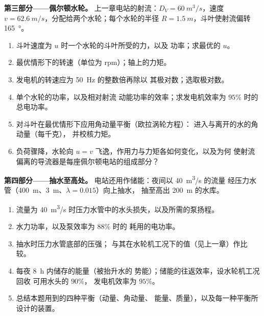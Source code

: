\begin{problem}
\medskip
\noindent\textbf{第三部分——佩尔顿水轮。}
上一章电站的射流：$D_V = \qty{60}{m^3/s}$，速度 $v =
\qty{62.6}{m/s}$，分配给两个水轮；每个水轮的半径 $R =
\qty{1.5}{m}$，斗叶使射流偏转 \qty{165}{\degree}。
\begin{enumerate}[resume]
  \item 斗叶速度为 $u$ 时一个水轮的斗叶所受的力，以及
        功率；求最优的 $u$。
  \item 最优情形下的转速（单位为 rpm）；轴上的力矩。
  \item 发电机的转速应为 \qty{50}{Hz} 的整数倍再除以
        其极对数；选取极对数。
  \item 单个水轮的功率，以及相对射流
        动能功率的效率；求发电机效率为 $95\%$ 时的
        总电功率。
  \item 对斗叶在最优情形下应用角动量平衡（欧拉涡轮方程）：
        进入与离开的水的角动量（每千克），
        并校核力矩。
  \item 负荷骤降，水轮向 $u =
        v$ 飞逸，作用力与力矩各如何变化，以及为何
        使射流偏离的导流器是每座佩尔顿电站的组成部分？
\end{enumerate}

\medskip
\noindent\textbf{第四部分——抽水至高处。}
电站还用作储能：夜间以 \qty{40}{m^3/s} 的流量
经压力水管（\qty{400}{m}、\qty{3}{m}、$\lambda = 0.015$）向上抽水，
抽至高出 \qty{200}{m} 的水库。
\begin{enumerate}[resume]
  \item 流量为 \qty{40}{m^3/s} 时压力水管中的水头损失，以及所需的泵扬程。
  \item 水力功率，以及泵效率为 $88\%$ 时的
        耗用的电功率。
  \item 抽水时压力水管底部的压强；
        与其在水轮机工况下的值（见上一章）作比较。
  \item 每夜 \qty{8}{h} 内储存的能量（被抬升水的
        势能）；储能的往返效率，设水轮机工况回收
        可用水头的 $90\%$，
        发电机效率为 $95\%$。
  \item 总结本题用到的四种平衡（动量、角动量、
        能量、质量），以及每一种平衡所设计的装置。
\end{enumerate}
\end{problem}
